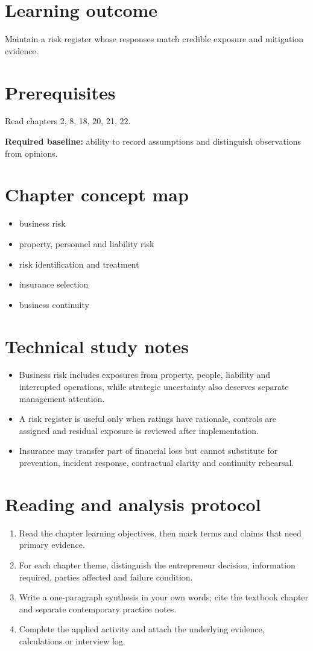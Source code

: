 \documentclass[11pt,letterpaper]{article}
\begin{document}
\SuiteOpen
\section{Learning outcome}
Maintain a risk register whose responses match credible exposure and mitigation evidence.
\section{Prerequisites}
Read chapters 2, 8, 18, 20, 21, 22.\par\textbf{Required baseline:} ability to record assumptions and distinguish observations from opinions.
\section{Chapter concept map}
\begin{itemize}[leftmargin=*,itemsep=3pt]
\item business risk
\item property, personnel and liability risk
\item risk identification and treatment
\item insurance selection
\item business continuity
\end{itemize}

\section{Technical study notes}
\begin{itemize}[leftmargin=*,itemsep=3pt]
\item Business risk includes exposures from property, people, liability and interrupted operations, while strategic uncertainty also deserves separate management attention.
\item A risk register is useful only when ratings have rationale, controls are assigned and residual exposure is reviewed after implementation.
\item Insurance may transfer part of financial loss but cannot substitute for prevention, incident response, contractual clarity and continuity rehearsal.
\end{itemize}

\section{Reading and analysis protocol}
\begin{enumerate}[leftmargin=*,itemsep=5pt]
\item Read the chapter learning objectives, then mark terms and claims that need primary evidence.
\item For each chapter theme, distinguish the entrepreneur decision, information required, parties affected and failure condition.
\item Write a one-paragraph synthesis in your own words; cite the textbook chapter and separate contemporary practice notes.
\item Complete the applied activity and attach the underlying evidence, calculations or interview log.
\end{enumerate}
\end{document}
